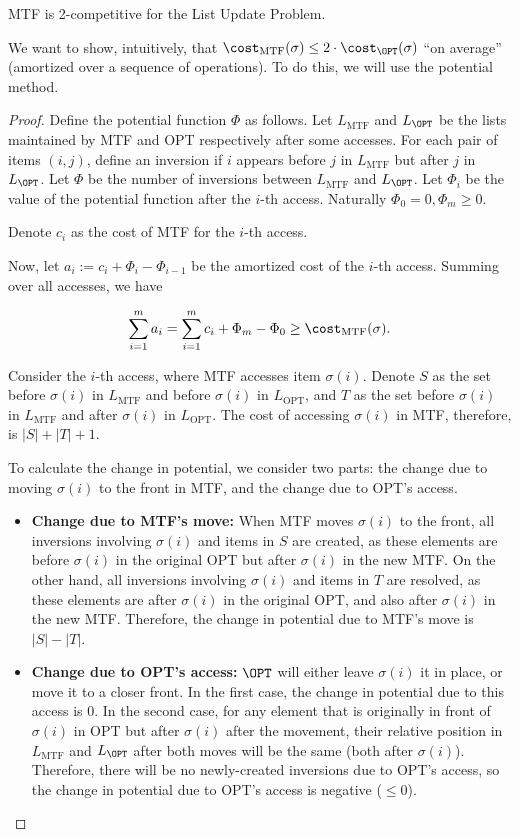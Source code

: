 \begin{theorem}
	MTF is 2-competitive for the List Update Problem.
\end{theorem}

We want to show, intuitively, that $\cost_{\text{MTF}}(\sigma) \leq 2 \cdot \cost_{\OPT}(\sigma)$ ``on average'' (amortized over a sequence of operations). To do this, we will use the potential method.

\begin{proof}
	Define the potential function $\Phi$ as follows. Let $L_{\text{MTF}}$ and $L_{\OPT}$ be the lists maintained by MTF and OPT respectively after some accesses. For each pair of items $(i, j)$, define an inversion if $i$ appears before $j$ in $L_{\text{MTF}}$ but after $j$ in $L_{\OPT}$. Let $\Phi$ be the number of inversions between $L_{\text{MTF}}$ and $L_{\OPT}$. Let $\Phi_i$ be the value of the potential function after the $i$-th access. Naturally $\Phi_0 = 0, \Phi_m \geq 0$.

	Denote $c_i$ as the cost of MTF for the $i$-th access.

	Now, let $a_i := c_i + \Phi_i - \Phi_{i-1}$ be the amortized cost of the $i$-th access. Summing over all accesses, we have

	\[ \sum_{i=1}^m a_i = \sum_{i=1}^m c_i + \Phi_m - \Phi_0 \geq \cost_{\text{MTF}}(\sigma). \]

	Consider the $i$-th access, where MTF accesses item $\sigma(i)$. Denote $S$ as the set before $\sigma(i)$ in $L_\text{MTF}$ and before $\sigma(i)$ in $L_\text{OPT}$, and $T$ as the set before $\sigma(i)$ in $L_\text{MTF}$ and after $\sigma(i)$ in $L_\text{OPT}$.
	The cost of accessing $\sigma(i)$ in MTF, therefore, is $|S|+|T|+1$.

	To calculate the change in potential, we consider two parts: the change due to moving $\sigma(i)$ to the front in MTF, and the change due to OPT's access.

	\begin{itemize}
		\item \textbf{Change due to MTF's move:} When MTF moves $\sigma(i)$ to the front, all inversions involving $\sigma(i)$ and items in $S$ are created, as these elements are before $\sigma(i)$ in the original OPT but after $\sigma(i)$ in the new MTF. On the other hand, all inversions involving $\sigma(i)$ and items in $T$ are resolved, as these elements are after $\sigma(i)$ in the original OPT, and also after $\sigma(i)$ in the new MTF. Therefore, the change in potential due to MTF's move is $|S| - |T|$.
		\item \textbf{Change due to OPT's access:} $\OPT$ will either leave $\sigma(i)$ it in place, or move it to a closer front. In the first case, the change in potential due to this access is 0. In the second case, for any element that is originally in front of $\sigma(i)$ in OPT but after $\sigma(i)$ after the movement, their relative position in $L_{\text{MTF}}$ and $L_{\OPT}$ after both moves will be the same (both after $\sigma(i)$). Therefore, there will be no newly-created inversions due to OPT's access, so the change in potential due to OPT's access is negative ($\leq 0$).
	\end{itemize}


\end{proof}
